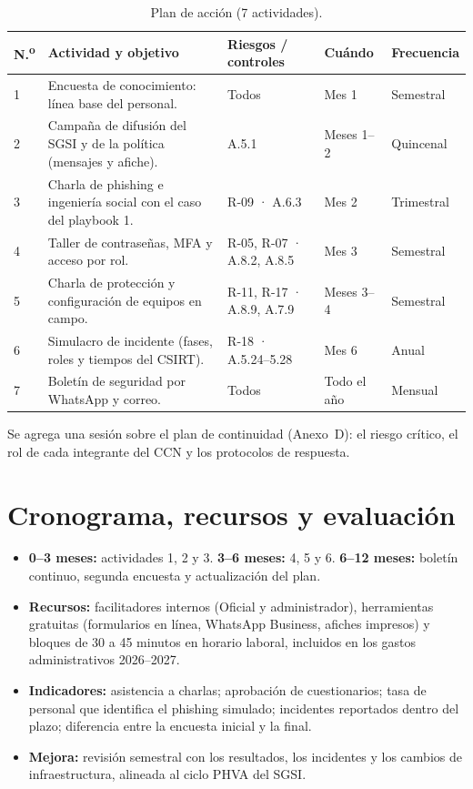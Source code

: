 \begin{table}[H]
\centering
\caption{Plan de acción (7 actividades).}
\label{tab:anx-conc-actividades}
\small
\begin{tabularx}{\textwidth}{C{0.5cm}XL{2.4cm}L{1.8cm}L{1.6cm}}
\toprule
\textbf{N.\textsuperscript{o}} & \textbf{Actividad y objetivo} & \textbf{Riesgos / controles} & \textbf{Cuándo} & \textbf{Frecuencia} \\
 & Encuesta de conocimiento: línea base del personal. & Todos & Mes 1 & Semestral \\
2 & Campaña de difusión del SGSI y de la política (mensajes y afiche). & A.5.1 & Meses 1--2 & Quincenal \\
3 & Charla de phishing e ingeniería social con el caso del playbook 1. & R-09 · A.6.3 & Mes 2 & Trimestral \\
4 & Taller de contraseñas, MFA y acceso por rol. & R-05, R-07 · A.8.2, A.8.5 & Mes 3 & Semestral \\
5 & Charla de protección y configuración de equipos en campo. & R-11, R-17 · A.8.9, A.7.9 & Meses 3--4 & Semestral \\
6 & Simulacro de incidente (fases, roles y tiempos del CSIRT). & R-18 · A.5.24--5.28 & Mes 6 & Anual \\
7 & Boletín de seguridad por WhatsApp y correo. & Todos & Todo el año & Mensual \\
\bottomrule
\end{tabularx}
\end{table}

\noindent Se agrega una sesión sobre el plan de continuidad (Anexo~D): el riesgo crítico, el
rol de cada integrante del CCN y los protocolos de respuesta.

\section{Cronograma, recursos y evaluación}
\begin{itemize}
  \item \textbf{0--3 meses:} actividades 1, 2 y 3. \textbf{3--6 meses:} 4, 5 y 6.
  \textbf{6--12 meses:} boletín continuo, segunda encuesta y actualización del plan.
  \item \textbf{Recursos:} facilitadores internos (Oficial y administrador), herramientas
  gratuitas (formularios en línea, WhatsApp Business, afiches impresos) y bloques de 30 a 45
  minutos en horario laboral, incluidos en los gastos administrativos 2026--2027.
  \item \textbf{Indicadores:} asistencia a charlas; aprobación de cuestionarios; tasa de
  personal que identifica el phishing simulado; incidentes reportados dentro del plazo;
  diferencia entre la encuesta inicial y la final.
  \item \textbf{Mejora:} revisión semestral con los resultados, los incidentes y los cambios de
  infraestructura, alineada al ciclo PHVA del SGSI.
\end{itemize}

